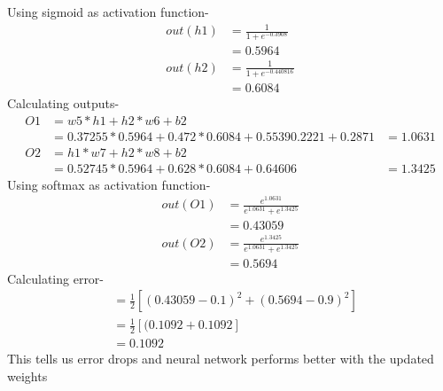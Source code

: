 \documentclass[12pt]{article}
\begin{document}
Using sigmoid as activation function-
\begin{align*}
    out(h1)
    &=\frac{1}{1+e^{-0.3908}} \\
    &=0.5964\\
    out(h2)
    &=\frac{1}{1+e^{-0.440816}}\\
    &=0.6084
\end{align*}
Calculating outputs-
\begin{align*}
    O1
    &= w5*h1+h2*w6+b2 \\
    &=0.37255*0.5964 + 0.472*0.6084 + 0.5539
    0.2221+0.2871
    &=1.0631\\
    O2
    &= h1*w7+h2*w8+b2 \\
    &=0.52745 * 0.5964 + 0.628 * 0.6084 + 0.64606
    &= 1.3425
\end{align*}
Using softmax as activation function-
\begin{align*}
    out(O1)
    &=\frac{e^{1.0631}}{e^{1.0631}+e^{1.3425}} \\
    &=0.43059\\
    out(O2)
    &=\frac{e^{1.3425}}{e^{1.0631}+e^{1.3425}}\\
    &=0.5694
\end{align*}
Calculating error-
\begin{align*}
    &=\frac{1}{2}[(0.43059-0.1)^2 + (0.5694-0.9)^2]\\
    &=\frac{1}{2}[(0.1092+0.1092]\\
    &=0.1092
\end{align*}
This tells us error drops and neural network performs better with the updated weights
\end{document}
